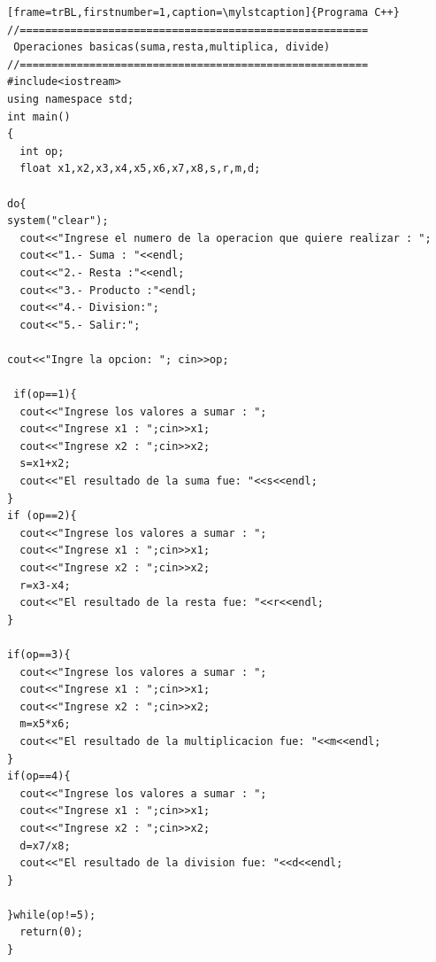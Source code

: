 \documentclass[a4paper,12pt,spanish]{article}
\newcommand\mylstcaption{}
\begin{document}
\begin{lstlisting}[frame=trBL,firstnumber=1,caption=\mylstcaption]{Programa C++}
//=======================================================
 Operaciones basicas(suma,resta,multiplica, divide)
//=======================================================
#include<iostream>
using namespace std;
int main()
{
  int op;
  float x1,x2,x3,x4,x5,x6,x7,x8,s,r,m,d;

do{
system("clear");  
  cout<<"Ingrese el numero de la operacion que quiere realizar : ";
  cout<<"1.- Suma : "<<endl;
  cout<<"2.- Resta :"<<endl;
  cout<<"3.- Producto :"<endl;
  cout<<"4.- Division:";
  cout<<"5.- Salir:";

cout<<"Ingre la opcion: "; cin>>op;

 if(op==1){
  cout<<"Ingrese los valores a sumar : ";
  cout<<"Ingrese x1 : ";cin>>x1;
  cout<<"Ingrese x2 : ";cin>>x2;
  s=x1+x2;
  cout<<"El resultado de la suma fue: "<<s<<endl;
}
if (op==2){
  cout<<"Ingrese los valores a sumar : ";
  cout<<"Ingrese x1 : ";cin>>x1;
  cout<<"Ingrese x2 : ";cin>>x2;
  r=x3-x4;
  cout<<"El resultado de la resta fue: "<<r<<endl;
}

if(op==3){
  cout<<"Ingrese los valores a sumar : ";
  cout<<"Ingrese x1 : ";cin>>x1;
  cout<<"Ingrese x2 : ";cin>>x2;
  m=x5*x6;
  cout<<"El resultado de la multiplicacion fue: "<<m<<endl;
}
if(op==4){
  cout<<"Ingrese los valores a sumar : ";
  cout<<"Ingrese x1 : ";cin>>x1;
  cout<<"Ingrese x2 : ";cin>>x2;
  d=x7/x8;
  cout<<"El resultado de la division fue: "<<d<<endl;
}

}while(op!=5);
  return(0);
}
  
\end{lstlisting}
\end{document}
